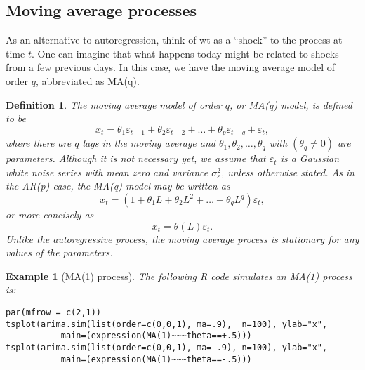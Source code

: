 \documentclass[
paper=128mm:96mm, %
fontsize=9.5pt, %
pagesize, %
parskip=half-, %
]{scrartcl} %
\def\qmo{``}
\def\qmcsp{'' }
\theoremstyle{mythmstyle} %
\newtheorem{definition}[theorem]{Definition} %
\newtheorem{example}[theorem]{Example} %
\def\qmo{``}
\def\qmcsp{'' }
\begin{document}
\subsection{Moving average processes}


As an alternative to autoregression, think of wt as a \qmo shock\qmcsp to the process at time $t$. One can imagine that what happens today might be related to shocks from a few previous days. In this case, we have the moving average model of order $q$, abbreviated as MA(q).
%
\begin{definition}
The moving average model of order $q$, or MA(q) model, is defined to be
%
\begin{equation}
\label{eq:maq_def}
x_t=\theta_1\varepsilon_{t-1}+\theta_2\varepsilon_{t-2} +\dots+\theta_p\varepsilon_{t-q} +\varepsilon_t,
\end{equation}
%
where there are $q$ lags in the moving average and $\theta_1,\theta_2,\dots,\theta_q$ with $\left(\theta_q\neq 0\right)$ are parameters. Although it is not necessary yet, we assume that $\varepsilon_t$ is a Gaussian white noise series with mean zero and variance $\sigma_\varepsilon^2$, unless otherwise stated. As in the AR(p) case, the MA(q) model may be written as
%
\begin{equation*}
x_t=\left(1+\theta_1L+\theta_2 L^2+\dots+\theta_qL^q\right)\varepsilon_t,
\end{equation*}
%
or more concisely as
%
\begin{equation*}
x_t=\theta\left(L\right)\varepsilon_t.
\end{equation*}
%
Unlike the autoregressive process, the moving average process is stationary for
any values of the parameters.
\end{definition}
\clearpage




\clearpage

\begin{example}[MA(1) process]

The following R code simulates an MA(1) process is:
%
\begin{lstlisting}[belowskip=-0.8 \baselineskip]
par(mfrow = c(2,1))
tsplot(arima.sim(list(order=c(0,0,1), ma=.9),  n=100), ylab="x",
           main=(expression(MA(1)~~~theta==+.5)))
tsplot(arima.sim(list(order=c(0,0,1), ma=-.9), n=100), ylab="x",
           main=(expression(MA(1)~~~theta==-.5)))
\end{lstlisting}
\end{example}
\clearpage
\end{document}
